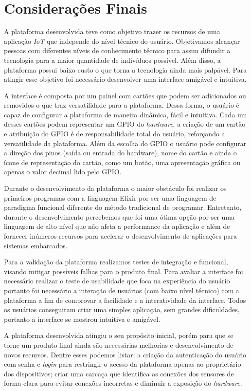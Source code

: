 \documentclass[../../layout.tex]{subfiles}
\begin{document}
\chapter{Considerações Finais}
A plataforma desenvolvida teve como objetivo trazer os recursos de uma aplicação \emph{IoT} que independe do nível técnico do usuário. Objetivamos alcançar pessoas com diferentes níveis de conhecimento técnico para assim difundir a tecnologia para a maior quantidade de indivíduos possível. Além disso, a plataforma possui baixo custo o que torna a tecnologia ainda mais palpável. Para atingir esse objetivo foi necessário desenvolver uma interface amigável e intuitiva.\par
A interface é composta por um painel com cartões que podem ser adicionados ou removidos o que traz versatilidade para a plataforma. Dessa forma, o usuário é capaz de configurar a plataforma de maneira dinâmica, fácil e intuitiva. Cada um desses cartões podem representar um GPIO do \emph{hardware}, a criação de um cartão e atribuição do GPIO é de responsabilidade total do usuário, reforçando a versatilidade da plataforma. Além da escolha do GPIO o usuário pode configurar a direção dos pinos (saída ou entrada do hardware), nome do cartão e ainda o ícone de representação do cartão, como um botão, uma apresentação gráfica ou apenas o valor decimal lido pelo GPIO.\par
Durante o desenvolvimento da plataforma o maior obstáculo foi realizar os primeiros programas com a linguagem Elixir por ser uma linguagem de paradigma funcional diferente do método tradicional de programar. Entretanto, durante o desenvolvimento percebemos que foi uma ótima opção por ser uma linguagem de alto nível que não afeta a performance da aplicação e além de fornecer inúmeros recursos para acelerar o desenvolvimento de aplicações para sistemas embarcados.\par
Para a validação da plataforma realizamos testes de integração e funcional, visando mitigar possíveis falhas para o produto final. Para avaliar a interface foi necessário realizar o teste de usabilidade que foca na experiência do usuário portanto foi necessário a interação de usuários (com baixo nível técnico) com a plataforma a fim de comprovar a facilidade e a interatividade da interface. Todos os usuários conseguiram criar uma simples aplicação, sem grandes dificuldades, portanto a interface se mostrou intuitiva e amigável.\par
A plataforma desenvolvida atingiu o seu propósito inicial, porém para que se torne um produto final ainda são necessárias melhorias e desenvolvimento de novos recursos. Dentre esses podemos listar: a criação da autenticação do usuário com senha e \emph{login} para restringir o acesso da plataforma apenas ao proprietário dos dispositivos; criar uma carcaça que identifica as conexões dos sensores de forma clara para evitar conexões incorretas e diminuir a exposição do \emph{hardware}.\par
\end{document}
